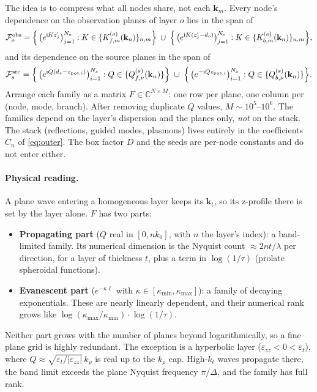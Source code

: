 \documentclass[11pt,a4paper]{article}
\newcommand{\kt}{\mathbf{k}_t}
\newcommand{\kn}{\mathbf{k}_n}
\newcommand{\km}{\mathbf{k}_m}
\newcommand{\ii}{\mathrm{i}}
\newcommand{\abs}[1]{\left\lvert #1 \right\rvert}
\theoremstyle{remark}
\begin{document}
The idea is to compress what all nodes share, not each $\km$. Every node's dependence on the observation
planes of layer $o$ lies in the span of
\begin{equation}
  \mathcal{F}^{\mathrm{obs}}_o = \Bigl\{\, \bigl(e^{\ii K z'_j}\bigr)_{j=1}^{N_o} : K\in\{K^{(o)}_{f,m}(\kn)\}_{n,m} \Bigr\}
  \;\cup\;
  \Bigl\{\, \bigl(e^{\ii K (z'_j-d_o)}\bigr)_{j=1}^{N_o} : K\in\{K^{(o)}_{b,m}(\kn)\}_{n,m} \Bigr\},
  \label{eq:famobs}
\end{equation}
and its dependence on the source planes in the span of
\begin{equation}
  \mathcal{F}^{\mathrm{src}}_s = \Bigl\{\, \bigl(e^{\ii Q (d_s-z_{\mathrm{pos},i})}\bigr)_{i=1}^{N_s} : Q\in\{Q^{(s)}_{f,\nu}(\kn)\} \Bigr\}
  \;\cup\;
  \Bigl\{\, \bigl(e^{-\ii Q z_{\mathrm{pos},i}}\bigr)_{i=1}^{N_s} : Q\in\{Q^{(s)}_{b,\nu}(\kn)\} \Bigr\}.
  \label{eq:famsrc}
\end{equation}
Arrange each family as a matrix $F\in\mathbb{C}^{N\times M}$: one row per plane, one column per (node, mode, branch).
After removing duplicate $Q$ values, $M\sim 10^5$--$10^6$. The families depend on the layer's
dispersion and the planes only, \emph{not} on the stack. The stack (reflections, guided modes,
plasmons) lives entirely in the coefficients $C_n$ of \eqref{eq:outer}. The box factor $D$ and the seeds are
per-node constants and do not enter either.

\paragraph{Physical reading.} A plane wave entering a homogeneous layer keeps its $\kt$, so its z-profile there is set by the layer
alone. $F$ has two parts:
\begin{itemize}[leftmargin=*]
\item \textbf{Propagating part} ($Q$ real in $[0, n k_0]$, with $n$ the layer's index): a band-limited family. Its numerical
  dimension is the Nyquist count $\approx 2 n t/\lambda$ per direction, for a layer of thickness $t$, plus a
  term in $\log(1/\tau)$ (prolate spheroidal functions).
\item \textbf{Evanescent part} ($e^{-\kappa\ell}$ with $\kappa\in[\kappa_{\min},\kappa_{\max}]$): a family of decaying
  exponentials. These are nearly linearly dependent, and their numerical rank grows like
  $\log(\kappa_{\max}/\kappa_{\min})\cdot\log(1/\tau)$.
\end{itemize}
Neither part grows with the number of planes beyond logarithmically, so a fine plane grid is
highly redundant. The exception is a hyperbolic layer ($\varepsilon_{zz}<0<\varepsilon_t$), where
$Q\approx\sqrt{\varepsilon_t/\abs{\varepsilon_{zz}}}\,k_\rho$ is real up to the $k_\rho$ cap. High-$k_t$ waves
propagate there, the band limit exceeds the plane Nyquist frequency $\pi/\Delta$, and the family has full rank.
\end{document}
